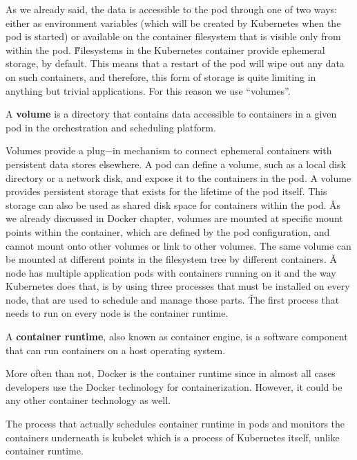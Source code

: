 As we already said, the data is accessible to the pod through one of two ways: either as environment variables (which
will be created by Kubernetes when the pod is started) or available on the container filesystem that is visible only
from within the pod. \v

Filesystems in the Kubernetes container provide ephemeral storage, by default. This means that a restart of the pod
will wipe out any data on such containers, and therefore, this form of storage is quite limiting in anything but
trivial applications. For this reason we use ``volumes''.

\bd[Volume]
A \textbf{volume} is a directory that contains data accessible to containers in a given pod in the orchestration and
scheduling platform.
\ed


Volumes provide a plug$-$in mechanism to connect ephemeral containers with persistent data stores elsewhere. A pod
can define a volume, such as a local disk directory or a network disk, and expose it to the containers in the pod. A
volume provides persistent storage that exists for the lifetime of the pod itself. This storage can also be used as
shared disk space for containers within the pod. \v

As we already discussed in Docker chapter, volumes are mounted at specific mount points within the container, which
are defined by the pod configuration, and cannot mount onto other volumes or link to other volumes. The same volume
can be mounted at different points in the filesystem tree by different containers. \v

A node has multiple application pods with containers running on it and the way Kubernetes does that, is by using
three processes that must be installed on every node, that are used to schedule and manage those parts. \v

The first process that needs to run on every node is the container runtime.

A \textbf{container runtime}, also known as container engine, is a software component that can run containers on a host
operating system.
\ed

More often than not, Docker is the container runtime since in almost all cases developers use the Docker technology
for containerization. However, it could be any other container technology as well.


The process that actually schedules container runtime in pods and monitors the containers underneath is kubelet which
is a process of Kubernetes itself, unlike container runtime.

